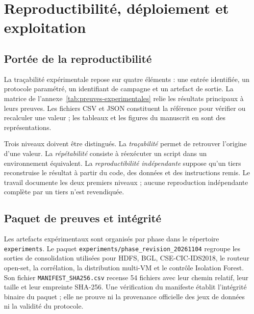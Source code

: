 
\chapter{Reproductibilité, déploiement et exploitation}
\label{chap:reproductibilite}

\section{Portée de la reproductibilité}

La traçabilité expérimentale repose sur quatre éléments : une entrée identifiée, un
protocole paramétré, un identifiant de campagne et un artefact de sortie. La matrice de
l'annexe~\ref{tab:preuves-experimentales} relie les résultats principaux à leurs preuves.
Les fichiers CSV et JSON constituent la référence pour vérifier ou recalculer une valeur ;
les tableaux et les figures du manuscrit en sont des représentations.

Trois niveaux doivent être distingués. La \emph{traçabilité} permet de retrouver l'origine
d'une valeur. La \emph{répétabilité} consiste à réexécuter un script dans un environnement
équivalent. La \emph{reproductibilité indépendante} suppose qu'un tiers reconstruise le
résultat à partir du code, des données et des instructions remis. Le travail documente les
deux premiers niveaux ; aucune reproduction indépendante complète par un tiers n'est
revendiquée.

\section{Paquet de preuves et intégrité}

Les artefacts expérimentaux sont organisés par phase dans le répertoire
\texttt{experiments}. Le paquet
\texttt{experiments/phase\_revision\_20261104} regroupe les sorties de consolidation
utilisées pour HDFS, BGL, CSE-CIC-IDS2018, le routeur open-set, la corrélation, la
distribution multi-VM et le contrôle Isolation Forest. Son fichier
\texttt{MANIFEST\_SHA256.csv} recense 54 fichiers avec leur chemin relatif, leur taille et
leur empreinte SHA-256. Une vérification du manifeste établit l'intégrité binaire du
paquet ; elle ne prouve ni la provenance officielle des jeux de données ni la validité du
protocole.

